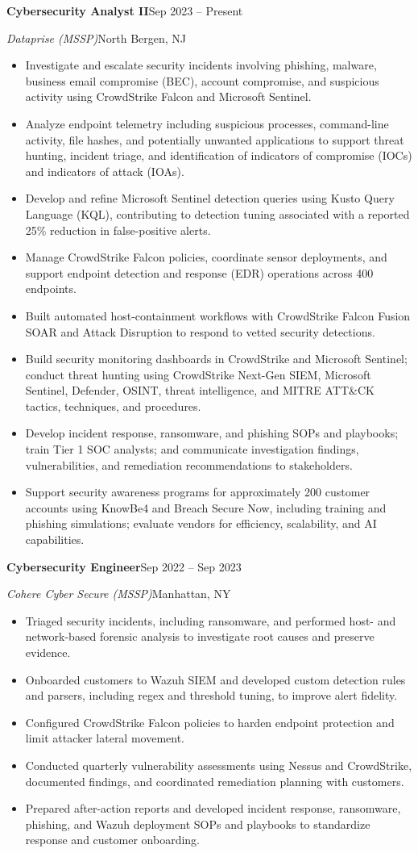 \documentclass[a4paper,10pt]{article}
\newcommand{\CVItem}[1]{\item\small{#1 \vspace{-2pt}}}
\newcommand{\CVSubheading}[4]{
  \needspace{4\baselineskip}\vspace{-3pt}\item
  \textbf{#1}\hfill #2\par
  {\small\emph{#3}\hfill #4}\par\vspace{-3pt}
}
\newcommand{\CVItemListStart}{\begin{itemize}[label=\textbullet, leftmargin=0.55cm, labelsep=0.25cm, itemsep=1pt, topsep=2pt, parsep=0pt]}
\newcommand{\CVItemListEnd}{\end{itemize}\vspace{-4pt}}
\begin{document}
  \CVSubheading
    {Cybersecurity Analyst II}{Sep 2023 -- Present}
    {Dataprise (MSSP)}{North Bergen, NJ}
    \CVItemListStart
      \CVItem{Investigate and escalate security incidents involving phishing, malware, business email compromise (BEC), account compromise, and suspicious activity using CrowdStrike Falcon and Microsoft Sentinel.}
      \CVItem{Analyze endpoint telemetry including suspicious processes, command-line activity, file hashes, and potentially unwanted applications to support threat hunting, incident triage, and identification of indicators of compromise (IOCs) and indicators of attack (IOAs).}
      \CVItem{Develop and refine Microsoft Sentinel detection queries using Kusto Query Language (KQL), contributing to detection tuning associated with a reported 25\% reduction in false-positive alerts.}
      \CVItem{Manage CrowdStrike Falcon policies, coordinate sensor deployments, and support endpoint detection and response (EDR) operations across 400 endpoints.}
      \CVItem{Built automated host-containment workflows with CrowdStrike Falcon Fusion SOAR and Attack Disruption to respond to vetted security detections.}
      \CVItem{Build security monitoring dashboards in CrowdStrike and Microsoft Sentinel; conduct threat hunting using CrowdStrike Next-Gen SIEM, Microsoft Sentinel, Defender, OSINT, threat intelligence, and MITRE ATT\&CK tactics, techniques, and procedures.}
      \CVItem{Develop incident response, ransomware, and phishing SOPs and playbooks; train Tier 1 SOC analysts; and communicate investigation findings, vulnerabilities, and remediation recommendations to stakeholders.}
      \CVItem{Support security awareness programs for approximately 200 customer accounts using KnowBe4 and Breach Secure Now, including training and phishing simulations; evaluate vendors for efficiency, scalability, and AI capabilities.}
    \CVItemListEnd

  \CVSubheading
    {Cybersecurity Engineer}{Sep 2022 -- Sep 2023}
    {Cohere Cyber Secure (MSSP)}{Manhattan, NY}
    \CVItemListStart
      \CVItem{Triaged security incidents, including ransomware, and performed host- and network-based forensic analysis to investigate root causes and preserve evidence.}
      \CVItem{Onboarded customers to Wazuh SIEM and developed custom detection rules and parsers, including regex and threshold tuning, to improve alert fidelity.}
      \CVItem{Configured CrowdStrike Falcon policies to harden endpoint protection and limit attacker lateral movement.}
      \CVItem{Conducted quarterly vulnerability assessments using Nessus and CrowdStrike, documented findings, and coordinated remediation planning with customers.}
      \CVItem{Prepared after-action reports and developed incident response, ransomware, phishing, and Wazuh deployment SOPs and playbooks to standardize response and customer onboarding.}
    \CVItemListEnd
\end{document}
